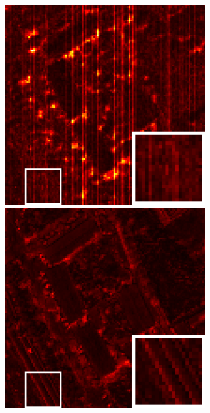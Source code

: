 \begin{figure}[t]
\begin{center}
		\vspace{1mm}
		
		\begin{minipage}{0.15\hsize}
			\centerline{\includegraphics[width=\hsize]{./fig_supplement/SAM_map_color_woboundary/PaviaU120/sam_map_LRTDTV.eps}} %
		\end{minipage}
		\begin{minipage}{0.15\hsize}
			\centerline{\includegraphics[width=\hsize]{./fig_supplement/SAM_map_color_woboundary/PaviaU120/sam_map_FGSLR.eps}} %

\end{minipage}
\end{center}
\end{figure}
